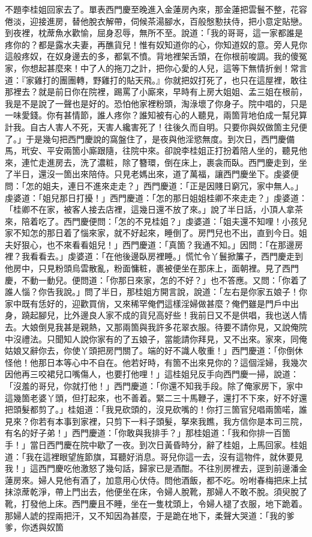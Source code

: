 \begin{showcontents}{}
不題李桂姐回家去了。單表西門慶至晚進入金蓮房內來，那金蓮把雲鬟不整，花容倦淡，迎接進房，替他脫衣解帶，伺候茶湯腳水，百般慇懃扶侍，把小意定貼戀。到夜裡，枕蓆魚水歡愉，屈身忍辱，無所不至。說道：「我的哥哥，這一家都誰是疼你的？都是露水夫妻，再醮貨兒！惟有奴知道你的心，你知道奴的意。旁人見你這般疼奴，在奴身邊去的多，都氣不憤。背地裡架舌頭，在你根前唆調。我的傻冤家，你想起甚麼來！中了人的拖刀之計，把你心愛的人兒，這等下無情折剉！常言道：『家雞打的團團轉，野雞打的貼天飛。』你就把奴打死了，也只在這屋裡，敢往那裡去？就是前日你在院裡，踢罵了小廝來，早時有上房大姐姐、孟三姐在根前，我是不是說了一聲也是好的。恐怕他家裡粉頭，淘淥壞了你身子。院中唱的，只是一味愛錢。你有甚情節，誰人疼你？誰知被有心的人聽見，兩箇背地伯成一幫兒算計我。自古人害人不死，天害人纔害死了！往後久而自明。只要你與奴做箇主兒便了。」于是幾句把西門慶說的窩盤住了，是夜與他淫慾無度。到次日，西門慶備馬，玳安、平安兩箇小廝跟隨，往院中來。卻說李桂姐正打扮着陪人坐的，聽見他來，連忙走進房去，洗了濃粧，除了簪環，倒在床上，裹衾而臥。西門慶走到，坐了半日，還沒一箇出來陪侍。只見老媽出來，道了萬福，讓西門慶坐下。虔婆便問：「怎的姐夫，連日不進來走走？」西門慶道：「正是因賤日窮冗，家中無人。」虔婆道：「姐兒那日打擾！」西門慶道：「怎的那日姐姐桂卿不來走走？」虔婆道：「桂卿不在家，被客人接去店裡，這幾日還不放了來。」說了半日話，小頂人拿茶來，陪着吃了。西門慶便問：「怎的不見桂姐？」虔婆道：「姐夫還不知哩！小孩兒家不知怎的那日着了惱來家，就不好起來，睡倒了。房門兒也不出，直到今日。姐夫好狠心，也不來看看姐兒！」西門慶道：「真箇？我通不知。」因問：「在那邊房裡？我看看去。」虔婆道：「在他後邊臥房裡睡。」慌忙令丫鬟掀簾子，西門慶走到他房中，只見粉頭烏雲散亂，粉面慵粧，裹被便坐在那床上，面朝裡。見了西門慶，不動一動兒。便問道：「你那日來家，怎的不好？」也不答應。又問：「你着了誰人惱？你告我說。」問了半日，那桂姐方開言說，說道：「左右是你家五娘子！你家中既有恁好的，迎歡買俏，又來稀罕俺們這樣淫婦做甚麼？俺們雖是門戶中出身，蹺起腳兒，比外邊良人家不成的貨兒高好些！我前日又不是供唱，我也送人情去。大娘倒見我甚是親熱，又那兩箇與我許多花翠衣服。待要不請你見，又說俺院中沒禮法。只聞知人說你家有的了五娘子，當能請你拜見，又不出來。家來，同俺姑娘又辭你去，你使丫頭把房門關了。端的好不識人敬重！」西門慶道：「你倒休怪他！他那日本等心中不自在。他若好時，有箇不出來見你的？這個淫婦，我幾次因他再三咬裙兒口嘴傷人，也要打他哩！」這桂姐兒反手向西門慶一掃，說道：「沒羞的哥兒，你就打他！」西門慶道：「你還不知我手段。除了俺家房下，家中這幾箇老婆丫頭，但打起來，也不善着。緊二三十馬鞭子，還打不下來，好不好還把頭髮都剪了。」桂姐道：「我見砍頭的，沒見砍嘴的！你打三箇官兒唱兩箇喏，誰見來？你若有本事到家裡，只剪下一料子頭髮，拏來我瞧，我方信你是本司三院，有名的好子弟！」西門慶道：「你敢與我排手？」那桂姐道：「我和你排一百箇手！」當日西門慶在院中歇了一夜。到次日黃昏時分，辭了桂姐，上馬回家。桂姐道：「我在這裡眼望旌節旗，耳聽好消息。哥兒你這一去，沒有這物件，就休要見我！」這西門慶吃他激怒了幾句話，歸家已是酒酣。不往別房裡去，逕到前邊潘金蓮房來。婦人見他有酒了，加意用心伏侍。問他酒飯，都不吃。吩咐春梅把床上拭抹涼蓆乾淨，帶上門出去，他便坐在床，令婦人脫靴，那婦人不敢不脫。須臾脫了靴，打發他上床。西門慶且不睡，坐在一隻枕頭上，令婦人褪了衣服，地下跪着。那婦人諕的捏兩把汗，又不知因為甚麼，于是跪在地下，柔聲大哭道：「我的爹爹，你透與奴箇
\end{showcontents}
